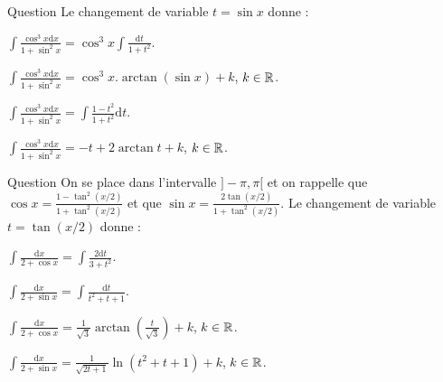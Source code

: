 \begin{multi}[multiple,feedback=
{D'abord, \(\displaystyle \frac{\cos ^3x}{1+\sin ^2x}=\frac{\cos x(1-\sin ^2x)}{1+\sin ^2x}\). Ensuite \(t=\sin x\Rightarrow\mathrm{d}t=\cos x\mathrm{d}x\) et
\[\int \frac{\cos ^3x\mathrm{d}x}{1+\sin ^2x}=\int \frac{1-t^2}{1+t^2}\mathrm{d}t=\int \left(-1+\frac{2}{1+t^2}\right)\mathrm{d}t=-t+2\arctan t+k,\; k\in \Rr.\]
}]{Question}
Le changement de variable \(t=\sin x\) donne :

    \item \(\displaystyle \int \frac{\cos ^3x\mathrm{d}x}{1+\sin ^2x}=\cos ^3 x\int \frac{\mathrm{d}t}{1+t^2}\).
    \item \(\displaystyle \int \frac{\cos ^3x\mathrm{d}x}{1+\sin ^2x}=\cos ^3 x.\arctan (\sin x)+k\), \(k\in \mathbb{R}\).
    \item* \(\displaystyle \int \frac{\cos ^3x\mathrm{d}x}{1+\sin ^2x}=\int \frac{1-t^2}{1+t^2}\mathrm{d}t\).
    \item* \(\displaystyle \int \frac{\cos ^3x\mathrm{d}x}{1+\sin ^2x}=-t+2\arctan t+k\), \(k\in \mathbb{R}\).
\end{multi}


\begin{multi}[multiple,feedback=
{Avec \(t=\tan (x/2)\), on a : \(\displaystyle \mathrm{d}x=\frac{2\mathrm{d}t}{1+t^2}\),
\[\frac{1}{2+\cos x}=\frac{1+t^2}{3+t^2}\quad \mbox{et}\quad \frac{1}{2+\sin x}=\frac{1+t^2}{2(t^2+t+1)}.\]
D'où
\[\int \frac{\mathrm{d}x}{2+\cos x}=\int \frac{2\mathrm{d}t}{3+t^2}=\frac{2}{\sqrt{3}}\arctan\left(\frac{t}{\sqrt{3}}\right)+k,\; k\in \Rr.\]
et
\[\int \frac{\mathrm{d}x}{2+\sin x}=\int \frac{\mathrm{d}t}{t^2+t+1}=\frac{2}{\sqrt{3}}\arctan\left(\frac{2t+1}{\sqrt{3}}\right)+k,\; k\in \Rr.\]
}]{Question}
On se place dans l'intervalle \(]-\pi,\pi[\) et on rappelle que \(\displaystyle \cos x=\frac{1-\tan ^2(x/2)}{1+\tan ^2(x/2)}\) et que \(\displaystyle \sin x=\frac{2\tan (x/2)}{1+\tan ^2(x/2)}\). Le changement de variable \(t=\tan (x/2)\) donne :

    \item* \(\displaystyle \int \frac{\mathrm{d}x}{2+\cos x}=\int \frac{2\mathrm{d}t}{3+t^2}\).
    \item* \(\displaystyle \int \frac{\mathrm{d}x}{2+\sin x}=\int \frac{\mathrm{d}t}{t^2+t+1}\).
    \item \(\displaystyle \int \frac{\mathrm{d}x}{2+\cos x}=\frac{1}{\sqrt{3}}\arctan\left(\frac{t}{\sqrt{3}}\right)+k\), \(k\in \mathbb{R}\).
    \item \(\displaystyle \int \frac{\mathrm{d}x}{2+\sin x}=\frac{1}{\sqrt{2t+1}}\ln (t^2+t+1)+k\), \(k\in \mathbb{R}\).
\end{multi}


